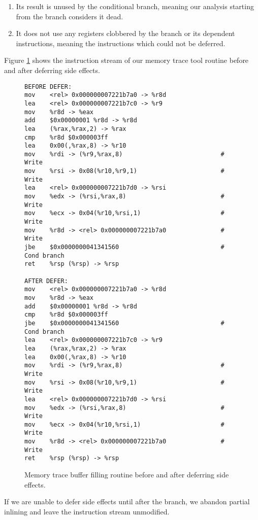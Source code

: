\begin{enumerate}
\item Its result is unused by the conditional branch, meaning our analysis
starting from the branch considers it dead.
\item It does not use any registers clobbered by the branch or its dependent
instructions, meaning the instructions which could not be deferred.
\end{enumerate}

Figure \ref{fig:memtrace_defer} shows the instruction stream of our memory trace
tool routine before and after deferring side effects.

\begin{figure}
\begin{verbatim}
BEFORE DEFER:
mov    <rel> 0x000000007221b7a0 -> %r8d
lea    <rel> 0x000000007221b7c0 -> %r9
mov    %r8d -> %eax
add    $0x00000001 %r8d -> %r8d
lea    (%rax,%rax,2) -> %rax
cmp    %r8d $0x000003ff
lea    0x00(,%rax,8) -> %r10
mov    %rdi -> (%r9,%rax,8)                           # Write
mov    %rsi -> 0x08(%r10,%r9,1)                       # Write
lea    <rel> 0x000000007221b7d0 -> %rsi
mov    %edx -> (%rsi,%rax,8)                          # Write
mov    %ecx -> 0x04(%r10,%rsi,1)                      # Write
mov    %r8d -> <rel> 0x000000007221b7a0               # Write
jbe    $0x0000000041341560                            # Cond branch
ret    %rsp (%rsp) -> %rsp

AFTER DEFER:
mov    <rel> 0x000000007221b7a0 -> %r8d
mov    %r8d -> %eax
add    $0x00000001 %r8d -> %r8d
cmp    %r8d $0x000003ff
jbe    $0x0000000041341560                            # Cond branch
lea    <rel> 0x000000007221b7c0 -> %r9
lea    (%rax,%rax,2) -> %rax
lea    0x00(,%rax,8) -> %r10
mov    %rdi -> (%r9,%rax,8)                           # Write
mov    %rsi -> 0x08(%r10,%r9,1)                       # Write
lea    <rel> 0x000000007221b7d0 -> %rsi
mov    %edx -> (%rsi,%rax,8)                          # Write
mov    %ecx -> 0x04(%r10,%rsi,1)                      # Write
mov    %r8d -> <rel> 0x000000007221b7a0               # Write
ret    %rsp (%rsp) -> %rsp
\end{verbatim}
\caption{Memory trace buffer filling routine before and after deferring side
effects.}
\label{fig:memtrace_defer}
\end{figure}

If we are unable to defer side effects until after the branch, we abandon
partial inlining and leave the instruction stream unmodified.

